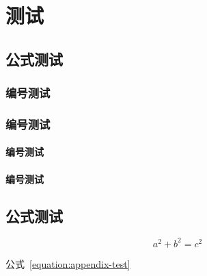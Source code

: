 \documentclass[type = bachelor]{whu-thesis}
\begin{document}
\chapter{测试}

\section{公式测试}
\subsection{编号测试}
\subsection{编号测试}
\subsubsection{编号测试}
\subsubsection{编号测试}

\section{公式测试}

\begin{equation}\label{equation:appendix-test}
  a^2 + b^2 = c^2
\end{equation}

公式~\eqref{equation:appendix-test}
\end{document}
